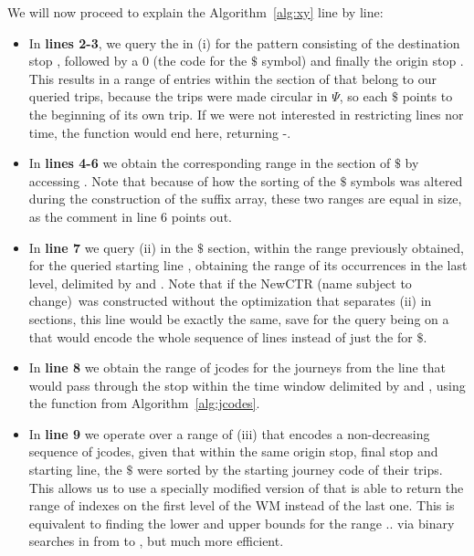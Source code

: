 \documentclass[runningheads]{llncs}
\newcommand{\ctr}{NewCTR (name subject to change)\ }
\begin{document}
We will now proceed to explain the Algorithm~\ref{alg:xy} line by line:
\begin{itemize}
    \item In \textbf{lines 2-3}, we query the  in (i) for the pattern consisting of the destination stop , followed by a 0 (the code for the $\$$ symbol) and finally the origin stop . This results in a range of entries within the section of  that belong to our queried trips, because the trips were made circular in $\Psi$, so each $\$$ points to the beginning of its own trip. If we were not interested in restricting lines nor time, the function would end here, returning -.
    
    \item In \textbf{lines 4-6} we obtain the corresponding range in the section of $\$$ by accessing \FuncSty{$\Psi$}. Note that because of how the sorting of the $\$$ symbols was altered during the construction of the suffix array, these two ranges are equal in size, as the comment in line 6 points out.
    
    \item In \textbf{line 7} we query (ii) in the $\$$ section, within the range previously obtained, for the queried starting line , obtaining the range of its occurrences in the last level, delimited by  and . Note that if the \ctr was constructed without the optimization that separates (ii) in sections, this line would be exactly the same, save for the query being on a  that would encode the whole sequence of lines instead of just the  for $\$$.
    
    \item In \textbf{line 8} we obtain the range of jcodes for the journeys from the line  that would pass through the stop  within the time window delimited by  and , using the function  from Algorithm~\ref{alg:jcodes}.
    
    \item In \textbf{line 9} we operate over a range of (iii) that encodes a non-decreasing sequence of jcodes, given that within the same origin stop, final stop and starting line, the $\$$ were sorted by the starting journey code of their trips. This allows us to use a specially modified version of  that is able to return the range of indexes on the first level of the WM instead of the last one. This is equivalent to finding the lower and upper bounds for the range $..$ via binary searches in  from  to , but much more efficient.
    

\end{itemize}
\end{document}
